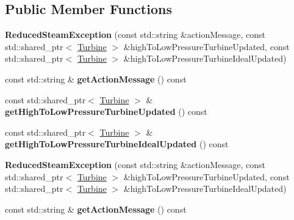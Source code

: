 \subsection*{Public Member Functions}
\begin{DoxyCompactItemize}
\item 
\mbox{\label{class_reduced_steam_exception_afc96e8f3ba0863ad109d45fa2ae75308}} 
{\bfseries Reduced\+Steam\+Exception} (const std\+::string \&action\+Message, const std\+::shared\+\_\+ptr$<$ \hyperlink{class_turbine}{Turbine} $>$ \&high\+To\+Low\+Pressure\+Turbine\+Updated, const std\+::shared\+\_\+ptr$<$ \hyperlink{class_turbine}{Turbine} $>$ \&high\+To\+Low\+Pressure\+Turbine\+Ideal\+Updated)
\item 
\mbox{\label{class_reduced_steam_exception_a9bb7c73c45ce1feb134b1c0040c88ac9}} 
const std\+::string \& {\bfseries get\+Action\+Message} () const
\item 
\mbox{\label{class_reduced_steam_exception_a262491cff4c40188b38798bd385e407b}} 
const std\+::shared\+\_\+ptr$<$ \hyperlink{class_turbine}{Turbine} $>$ \& {\bfseries get\+High\+To\+Low\+Pressure\+Turbine\+Updated} () const
\item 
\mbox{\label{class_reduced_steam_exception_ae76c87e6009f3cb9b3761469efce845d}} 
const std\+::shared\+\_\+ptr$<$ \hyperlink{class_turbine}{Turbine} $>$ \& {\bfseries get\+High\+To\+Low\+Pressure\+Turbine\+Ideal\+Updated} () const
\item 
\mbox{\label{class_reduced_steam_exception_afc96e8f3ba0863ad109d45fa2ae75308}} 
{\bfseries Reduced\+Steam\+Exception} (const std\+::string \&action\+Message, const std\+::shared\+\_\+ptr$<$ \hyperlink{class_turbine}{Turbine} $>$ \&high\+To\+Low\+Pressure\+Turbine\+Updated, const std\+::shared\+\_\+ptr$<$ \hyperlink{class_turbine}{Turbine} $>$ \&high\+To\+Low\+Pressure\+Turbine\+Ideal\+Updated)
\item 
\mbox{\label{class_reduced_steam_exception_a80743e934f15a87998206463f7a3dec7}} 
const std\+::string \& {\bfseries get\+Action\+Message} () const
\item 
\mbox{\label{class_reduced_steam_exception_a50f300c4df4c5f2493cf29c2b59ff781}} 

\end{DoxyCompactItemize}
